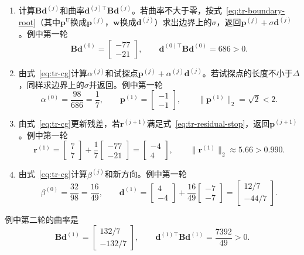 \begin{enumerate}
 \item 计算$\bm{B}\bm{d}^{(j)}$和曲率$\bm{d}^{(j)\top}\bm{B}\bm{d}^{(j)}$。若曲率不大于零，按式~\eqref{eq:tr-boundary-root}（其中$\bm{p}^{\mathrm{U}}$换成$\bm{p}^{(j)}$，$\bm{w}$换成$\bm{d}^{(j)}$）求出边界上的$\sigma$，返回$\bm{p}^{(j)}+\sigma\bm{d}^{(j)}$。例中第一轮
 \[
  \bm{B}\bm{d}^{(0)}=\begin{bmatrix}-77\\-21\end{bmatrix},\qquad
  \bm{d}^{(0)\top}\bm{B}\bm{d}^{(0)}=686>0.
 \]
 \item 由式~\eqref{eq:tr-cg}计算$\alpha^{(j)}$和试探点$\bm{p}^{(j)}+\alpha^{(j)}\bm{d}^{(j)}$。若试探点的长度不小于$\Delta$，同样求边界上的$\sigma$并返回。例中第一轮
 \[
  \alpha^{(0)}=\frac{98}{686}=\frac17,\qquad
  \bm{p}^{(1)}=\begin{bmatrix}-1\\-1\end{bmatrix},\qquad\lVert\bm{p}^{(1)}\rVert_2=\sqrt2<2.
 \]
 \item 由式~\eqref{eq:tr-cg}更新残差，若$\bm{r}^{(j+1)}$满足式~\eqref{eq:tr-residual-stop}，返回$\bm{p}^{(j+1)}$。例中第一轮
 \[
  \bm{r}^{(1)}=\begin{bmatrix}7\\7\end{bmatrix}+\frac17\begin{bmatrix}-77\\-21\end{bmatrix}=\begin{bmatrix}-4\\4\end{bmatrix},\qquad
  \lVert\bm{r}^{(1)}\rVert_2\approx5.66>0.990.
 \]
 \item 由式~\eqref{eq:tr-cg}计算$\beta^{(j)}$和新方向。例中第一轮
 \[
  \beta^{(0)}=\frac{32}{98}=\frac{16}{49},\qquad
  \bm{d}^{(1)}=\begin{bmatrix}4\\-4\end{bmatrix}+\frac{16}{49}\begin{bmatrix}-7\\-7\end{bmatrix}=\begin{bmatrix}12/7\\-44/7\end{bmatrix}.
 \]
\end{enumerate}

例中第二轮的曲率是
\[
 \bm{B}\bm{d}^{(1)}=\begin{bmatrix}132/7\\-132/7\end{bmatrix},\qquad
 \bm{d}^{(1)\top}\bm{B}\bm{d}^{(1)}=\frac{7392}{49}>0.
\]

